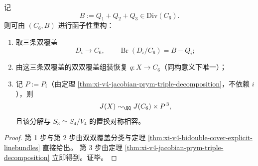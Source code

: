 \begin{theorem}\label{thm:xi-v4-reconstruction-from-c6-threepoints-prym-triple}
记
\[
B:=Q_1+Q_2+Q_3\in \mathrm{Div}(C_6).
\]
则可由 \((C_6,B)\) 进行函子性重构：
\begin{enumerate}
  \item 取三条双覆盖
  \[
  D_i\to C_6,\qquad \operatorname{Br}(D_i/C_6)=B-Q_i;
  \]
  \item 由这三条双覆盖的双双覆盖组装恢复 \(q:X\to C_6\)（同构意义下唯一）；
  \item 记 \(P:=P_i\)（由定理 \ref{thm:xi-v4-jacobian-prym-triple-decomposition}，不依赖 \(i\)），则
  \[
  J(X)\sim_{\QQ}J(C_6)\times P^{\,3},
  \]
  且该分解与 \(S_3\simeq S_4/V_4\) 的置换对称相容。
\end{enumerate}
\end{theorem}
\begin{proof}
第 1 步与第 2 步由双双覆盖分类与定理
\ref{thm:xi-v4-bidouble-cover-explicit-linebundles}
直接给出。
第 3 步由定理 \ref{thm:xi-v4-jacobian-prym-triple-decomposition} 立即得到。证毕。
\end{proof}

\endinput
